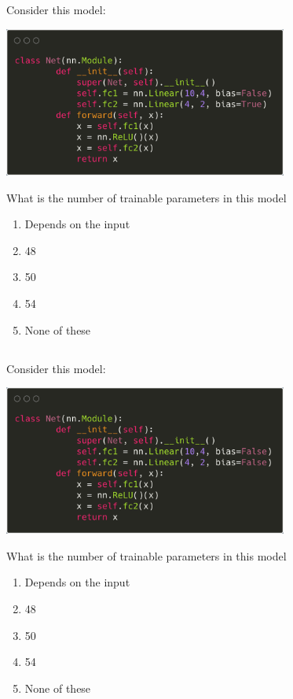 \begin{frame}
\section{}
Consider this model:

\includegraphics[width=0.7\textwidth]{images/quiz_4_4_2_5.png}

What is the number of trainable parameters in this model


\begin{enumerate}[label=(\Alph*)]
\item Depends on the input
\item 48
\item 50    %
\item 54
\item None of these   %
\end{enumerate}

\end{frame}


\begin{frame}
\section{}
Consider this model:

\includegraphics[width=0.7\textwidth]{images/quiz_4_4_2_6.png}

What is the number of trainable parameters in this model


\begin{enumerate}[label=(\Alph*)]
\item Depends on the input
\item 48    %
\item 50
\item 54
\item None of these   %
\end{enumerate}

\end{frame}
